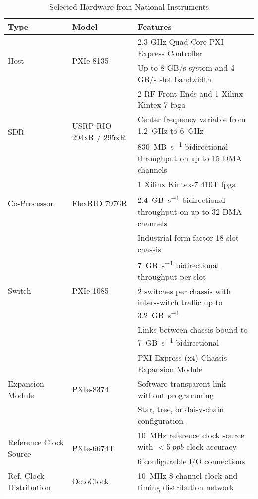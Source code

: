 \documentclass[journal]{IEEEtran}
\begin{document}
\begin{table*}[t]
	\centering
	\footnotesize
	\caption{Selected Hardware from National Instruments}
	\noindent\begin{tabular}{lll}
		\toprule
		\textbf{Type} & \textbf{Model} & \textbf{Features} \\
		\midrule
		\multirow{2}{*}{Host}&\multirow{2}{*}{PXIe-8135} & 2.3 GHz Quad-Core PXI Express Controller \\
		&& Up to 8 GB/s system and 4 GB/s slot bandwidth \\
		\midrule
		\multirow{3}{*}{SDR}&\multirow{3}{*}{USRP RIO 294xR / 295xR} & 2 RF Front Ends and 1 Xilinx Kintex-7 \gls{fpga} \\
		&& Center frequency variable from \SI{1.2}{\giga\hertz} to \SI{6}{\giga\hertz} \\
		&& \SI{830}{\mega B\per\second} bidirectional throughput on up to 15 DMA channels\\
		\midrule
		\multirow{2}{*}{Co-Processor}&\multirow{2}{*}{FlexRIO 7976R} & 1 Xilinx Kintex-7 410T \gls{fpga} \\
		&& \SI{2.4}{\giga B\per\second} bidirectional throughput on up to 32 DMA channels\\
		\midrule
		\multirow{4}{*}{Switch}&\multirow{4}{*}{PXIe-1085} & Industrial form factor 18-slot chassis \\
		&& \SI{7}{\giga B\per\second} bidirectional throughput per slot\\
		&& 2 switches per chassis with inter-switch traffic up to \SI{3.2}{\giga B\per\second} \\
		&& Links between chassis bound to \SI{7}{\giga B\per\second} bidirectional \\
		\midrule
		\multirow{3}{*}{Expansion Module}&\multirow{3}{*}{PXIe-8374} & PXI Express (x4) Chassis Expansion Module \\
		&& Software-transparent link without programming\\
		&& Star, tree, or daisy-chain configuration\\
		\midrule
		\multirow{2}{*}{Reference Clock Source}&\multirow{2}{*}{PXIe-6674T} & \SI{10}{\mega\hertz} reference clock source with $<\SI{5}{ppb}$ clock accuracy \\
		&& 6 configurable I/O connections\\
		\midrule
		Ref. Clock Distribution&OctoClock & \SI{10}{\mega\hertz} 8-channel clock and timing distribution network \\
		\bottomrule
	\end{tabular}
	\label{table:Selected_Hardware}
\end{table*}
\end{document}
